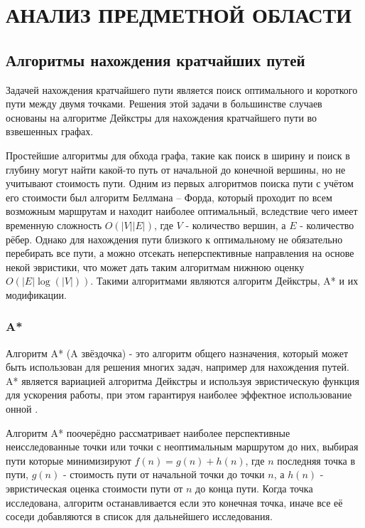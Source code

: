 \section[Анализ предметной области]{\MakeTextUppercase{АНАЛИЗ ПРЕДМЕТНОЙ ОБЛАСТИ}}
\vspace{-1\baselineskip} 
\subsection{Алгоритмы нахождения кратчайших путей}

Задачей нахождения кратчайшего пути является поиск оптимального и короткого пути между двумя точками. Решения этой задачи в большинстве случаев основаны на алгоритме Дейкстры \cite{Dijkstra} для нахождения кратчайшего пути во взвешенных графах. 

Простейшие алгоритмы для обхода графа, такие как поиск в ширину и поиск в глубину могут найти какой-то путь от начальной до конечной вершины, но не учитывают стоимость пути. Одним из первых алгоритмов поиска пути с учётом его стоимости был алгоритм Беллмана -- Форда, который проходит по всем возможным маршрутам и находит наиболее оптимальный, вследствие чего имеет временную сложность $O(|V||E|)$, где $V$ - количество вершин, а $E$ - количество рёбер. Однако для нахождения пути близкого к оптимальному не обязательно перебирать все пути, а можно отсекать неперспективные направления на основе некой эвристики, что может дать таким алгоритмам нижнюю оценку $O(|E|\log(|V|))$. Такими алгоритмами являются алгоритм Дейкстры, A* и их модификации.

\subsubsection{A*}

Алгоритм A{*} (A звёздочка) - это алгоритм общего назначения, который может быть использован для решения многих задач, например для нахождения путей. A{*} является вариацией алгоритма Дейкстры и используя эвристическую функция для ускорения работы, при этом гарантируя наиболее эффектное использование онной \cite{A_STAR}. 

Алгоритм A{*} поочерёдно рассматривает наиболее перспективные неисследованные точки или точки с неоптимальным маршрутом до них, выбирая пути которые минимизируют $ f(n) = g(n) + h(n) $, где $n$ последняя точка в пути, $g(n)$ - стоимость пути от начальной точки до точки $n$, а $h(n)$ - эвристическая оценка стоимости пути от $n$ до конца пути. Когда точка исследована, алгоритм останавливается если это конечная точка, иначе все её соседи добавляются в список для дальнейшего исследования.

